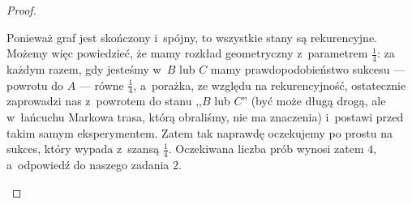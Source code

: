 \begin{proof}
\begin{enumerate}[label=(\roman*)]
		      Ponieważ graf jest skończony i~spójny, to wszystkie stany są rekurencyjne. Możemy więc powiedzieć, że mamy rozkład geometryczny z~parametrem \(\frac{1}{4}\): za każdym razem, gdy jesteśmy w~\(B\) lub \(C\) mamy prawdopodobieństwo sukcesu --- powrotu do \(A\) --- równe \(\frac{1}{4}\), a~porażka, ze względu na rekurencyjność, ostatecznie zaprowadzi nas z~powrotem do stanu ,,\(B\) lub \(C\)'' (być może długą drogą, ale w~łańcuchu Markowa trasa, którą obraliśmy, nie ma znaczenia) i~postawi przed takim samym eksperymentem. Zatem tak naprawdę oczekujemy po prostu na sukces, który wypada z~szansą \(\frac{1}{4}\). Oczekiwana liczba prób wynosi zatem \(4\), a~odpowiedź do naszego zadania \(2\).
	\end{enumerate}
\end{proof}
